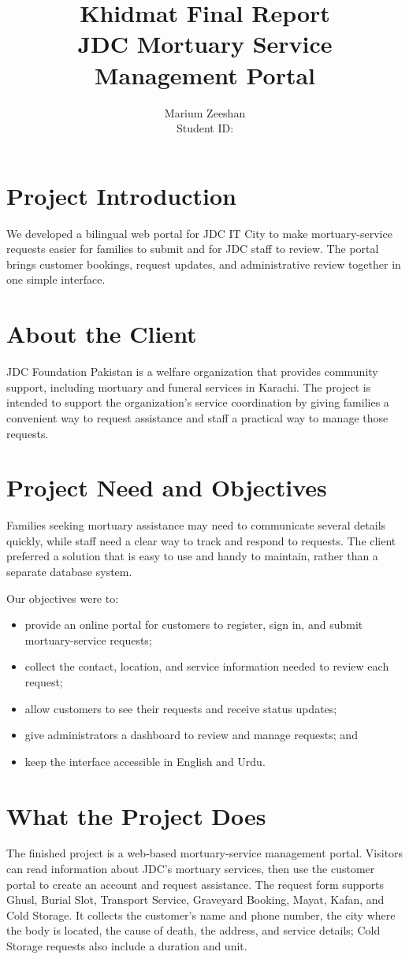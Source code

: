 \documentclass[12pt]{article}
\title{\textbf{Khidmat Final Report}\\[0.4em]
  JDC Mortuary Service Management Portal}
\author{
  Marium Zeeshan\\
  Student ID: \rule{4cm}{0.4pt}
}
\date{}
\begin{document}
\maketitle

\section*{Project Introduction}
We developed a bilingual web portal for JDC IT City to make mortuary-service requests easier for families to submit and for JDC staff to review. The portal brings customer bookings, request updates, and administrative review together in one simple interface.

\section*{About the Client}
JDC Foundation Pakistan is a welfare organization that provides community support, including mortuary and funeral services in Karachi. The project is intended to support the organization's service coordination by giving families a convenient way to request assistance and staff a practical way to manage those requests.

\section*{Project Need and Objectives}
Families seeking mortuary assistance may need to communicate several details quickly, while staff need a clear way to track and respond to requests. The client preferred a solution that is easy to use and handy to maintain, rather than a separate database system.

Our objectives were to:
\begin{itemize}[leftmargin=*]
  \item provide an online portal for customers to register, sign in, and submit mortuary-service requests;
  \item collect the contact, location, and service information needed to review each request;
  \item allow customers to see their requests and receive status updates;
  \item give administrators a dashboard to review and manage requests; and
  \item keep the interface accessible in English and Urdu.
\end{itemize}

\section*{What the Project Does}
The finished project is a web-based mortuary-service management portal. Visitors can read information about JDC's mortuary services, then use the customer portal to create an account and request assistance. The request form supports Ghusl, Burial Slot, Transport Service, Graveyard Booking, Mayat, Kafan, and Cold Storage. It collects the customer's name and phone number, the city where the body is located, the cause of death, the address, and service details; Cold Storage requests also include a duration and unit.
\end{document}
